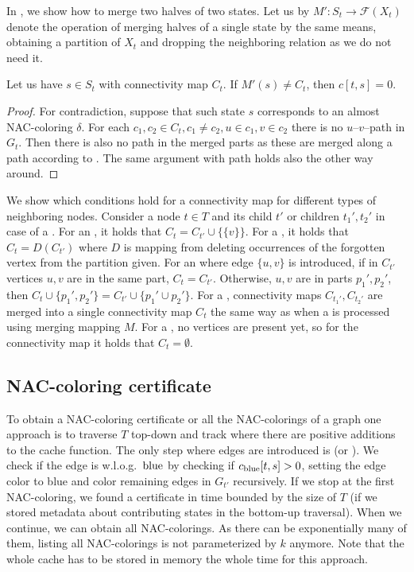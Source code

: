 In , we show how to merge
two halves of two states. Let us by \( M': S_t \to \mathcal{F}(X_t) \) denote
the operation of merging halves of a single state by the same means,
obtaining a partition of \( X_t \) and dropping
the neighboring relation as we do not need it.
%
\begin{lemma}
	Let us have \( s \in S_t \) with connectivity map \( C_t \).
	If \( M'(s) \ne C_t \), then \( c[t, s] = 0 \).
\end{lemma}
%
\begin{proof}
	For contradiction, suppose that such state \( s \)
	corresponds to an almost NAC-coloring \( \delta \).
	For each \( c_1, c_2 \in C_t, c_1 \ne c_2, u \in c_1, v \in c_2 \)
	there is no \( u \)--\( v \)--path in \( G_t \).
	Then there is also no path in the merged parts as
	these are merged along a path according to .
	The same argument with path holds also the other way around.
\end{proof}
%
We show which conditions hold for a connectivity map
for different types of neighboring nodes.
Consider a node \( t \in T \) and its child \( t' \)
or children \( t_1', t_2' \) in case of a \JoinNode{}.
%
For an \IntroduceVertexNode{}, it holds that
\( C_t = C_{t'} \cup \{\{ v \}\} \).
%
For a \ForgetVertexNode{}, it holds that
\( C_t = D(C_{t'}) \)
where \( D \) is mapping from 
deleting occurrences of the forgotten vertex from the partition given.
%
For an \IntroduceEdgeNode{}
where edge \( \{u, v\} \) is introduced,
if in \( C_{t'} \) vertices \( u, v \) are in the same part, \( C_t = C_{t'} \).
Otherwise, \( u, v \) are in parts \( p_1', p_2' \), then 
\( C_t \cup \{p_1', p_2'\} = C_{t'} \cup \{ p_1' \cup p_2'\} \).
%
For a \JoinNode{},
connectivity maps \( C_{t_1'}, C_{t_2'} \) are merged into
a single connectivity map \( C_t \)
the same way as when a \JoinNode{} is processed using merging mapping \( M \).
%
For a \LeafNode{},
no vertices are present yet, so for the connectivity map it holds that \( C_t = \emptyset \).


\subsection{NAC-coloring certificate}

To obtain a NAC-coloring certificate or all the NAC-colorings of a graph
one approach is to traverse \( T \) top-down 
and track where there are positive additions to the cache function.
%
The only step where edges are introduced is \IntroduceEdgeNode{}
(or \IntroduceVertexWithEdgesNode{}).
We check if the edge is w.l.o.g.\ \( \text{blue} \) by checking if \( c_{\text{blue}}[t,s] > 0 \),
setting the edge color to blue and color remaining edges in \( G_{t'} \) recursively.
If we stop at the first NAC-coloring, we found a certificate in time bounded by
the size of \( T \)
(if we stored metadata about contributing states in the bottom-up traversal).
%
When we continue, we can obtain all NAC-colorings.
As there can be exponentially many of them,
listing all NAC-colorings is not parameterized by \( k \) anymore.
Note that the whole cache has to be stored in memory
the whole time for this approach.

